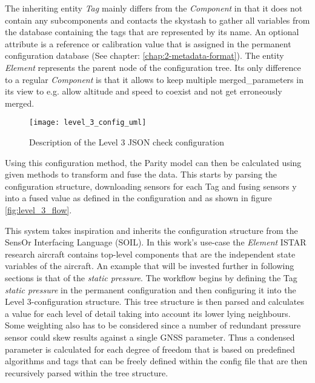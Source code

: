 The inheriting entity \textit{Tag} mainly differs from the \textit{Component} in that it does not contain any subcomponents and contacts the skystash to gather all variables from the database containing the tags that are represented by its name. An optional attribute is a reference or calibration value that is assigned in the permanent configuration database (See chapter: \ref{chap:2-metadata-format}).
The entity \textit{Element} represents the parent node of the configuration tree. Its only difference to a regular \textit{Component} is that it allows to keep multiple merged_parameters in its view to e.g. allow altitude and speed to coexist and not get erroneously merged.

\begin{figure}
    \centering
    \texttt{[image: level\_3\_config\_uml]}
    \caption{Description of the Level 3 JSON check configuration}
    \label{fig:level_3_config_uml}
\end{figure}

Using this configuration method, the Parity model can then be calculated using given methods to transform and fuse the data. This starts by parsing the configuration structure, downloading sensors for each Tag and fusing sensors y into a fused value as defined in the configuration and as shown in figure \ref{fig:level_3_flow}.



This system takes inspiration and inherits the configuration structure from the SensOr Interfacing Language (SOIL)\cite{behrens_domain-specific_2021}. In this work's use-case the \textit{Element} ISTAR research aircraft contains top-level components that are the independent state variables of the aircraft. An example that will be invested further in following sections is that of the \textit{static pressure}. The workflow begins by defining the Tag \textit{static pressure} in the permanent configuration and then configuring it into the Level 3-configuration structure. This tree structure is then parsed and calculates a value for each level of detail taking into account its lower lying neighbours. Some weighting also has to be considered since a number of redundant pressure sensor could skew results against a single GNSS parameter. Thus a condensed parameter is calculated for each degree of freedom that is based on predefined algorithms and tags that can be freely defined within the config file that are then recursively parsed within the tree structure.

